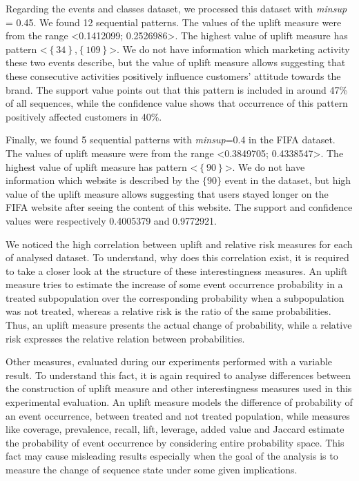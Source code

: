 \documentclass[runningheads,a4paper]{llncs}
\begin{document}
Regarding the events and classes dataset, we processed this dataset with \textit{minsup} = 0.45. We found 12 sequential patterns. The values of the uplift measure were from the range \textless 0.1412099; 0.2526986\textgreater. The highest value of uplift measure has pattern \textless$\left\{\text{34}\right\}$,$\left\{\text{109}\right\}$\textgreater. We do not have information which marketing activity these two events describe, but the value of uplift measure allows suggesting that these consecutive activities positively influence customers’ attitude towards the brand. The support value points out that this pattern is included in around 47\% of all sequences, while the confidence value shows that occurrence of this pattern positively affected customers in 40\%.

Finally, we found 5 sequential patterns with \textit{minsup}=0.4 in the FIFA dataset. The values of uplift measure were from the range \textless 0.3849705; 0.4338547\textgreater. The highest value of uplift measure has pattern \textless$\left\{\text{90}\right\}$\textgreater. We do not have information which website is described by the $\{\text{90}\}$ event in the dataset, but high value of the uplift measure allows suggesting that users stayed longer on the FIFA website after seeing the content of this website. The support and confidence values were respectively 0.4005379 and 0.9772921.

We noticed the high correlation between uplift and relative risk measures for each of analysed dataset. To understand, why does this correlation exist, it is required to take a closer look at the structure of these interestingness measures. An uplift measure tries to estimate the increase of some event occurrence probability in a treated subpopulation over the corresponding probability when a subpopulation was not treated, whereas a relative risk is the ratio of the same probabilities. Thus, an uplift measure presents the actual change of probability, while a relative risk expresses the relative relation between probabilities.

Other measures, evaluated during our experiments performed with a variable result. To understand this fact, it is again required to analyse differences between the construction of uplift measure and other interestingness measures used in this experimental evaluation. An uplift measure models the difference of probability of an event occurrence, between treated and not treated population, while measures like coverage, prevalence, recall, lift, leverage, added value and Jaccard estimate the probability of event occurrence by considering entire probability space. This fact may cause misleading results especially when the goal of the analysis is to measure the change of sequence state under some given implications.
\end{document}
